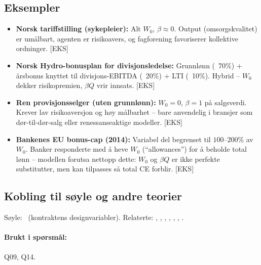 \subsection*{Eksempler}
\begin{itemize}\setlength{\itemsep}{2pt}
\item \textbf{Norsk tariffstilling (sykepleier):} Alt $W_0$, $\beta\approx 0$. Output (omsorgskvalitet) er umålbart, agenten er risikoavers, og fagforening favoriserer kollektive ordninger. [EKS]
\item \textbf{Norsk Hydro-bonusplan for divisjonsledelse:} Grunnlønn (~70\%) + årsbonus knyttet til divisjons-EBITDA (~20\%) + LTI (~10\%). Hybrid -- $W_0$ dekker risikopremien, $\beta Q$ vrir innsats. [EKS]
\item \textbf{Ren provisjonsselger (uten grunnlønn):} $W_0=0$, $\beta=1$ på salgsverdi. Krever lav risikoaversjon og høy målbarhet -- bare anvendelig i bransjer som dør-til-dør-salg eller renessanseaktige modeller. [EKS]
\item \textbf{Bankenes EU bonus-cap (2014):} Variabel del begrenset til $100$--$200$\% av $W_0$. Banker responderte med å heve $W_0$ (``allowances'') for å beholde total lønn -- modellen forutsa nettopp dette: $W_0$ og $\beta Q$ er ikke perfekte substitutter, men kan tilpasses så total CE forblir. [EKS]
\end{itemize}

\subsection*{Kobling til søyle og andre teorier}
Søyle: \SThree\ (kontraktens designvariabler). Relaterte: , , , , , , .

\paragraph{Brukt i spørsmål:} Q09, Q14.
